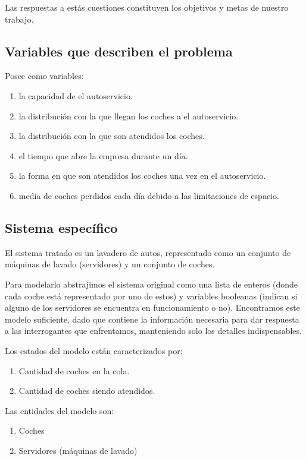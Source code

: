 \documentclass[14pt]{extarticle}
\begin{document}
Las respuestas a estás cuestiones constituyen los objetivos y metas de nuestro trabajo.


\subsection{Variables que describen el problema}
Posee como variables:

\begin{enumerate}
    \item la capacidad de el autoservicio.
    \item la distribución con la que llegan los coches a el autoservicio.
    \item la distribución con la que son atendidos los coches.
    \item el tiempo que abre la empresa durante un día.
    \item la forma en que son atendidos los coches una vez en el autoservicio.
    \item media de coches perdidos cada día debido a las limitaciones de espacio.
\end{enumerate}

\subsection{Sistema específico}

El sistema tratado es un lavadero de autos, representado como un conjunto de máquinas de lavado (servidores) y un conjunto de coches.

Para modelarlo abstrajimos el sistema original como una lista de enteros (donde cada coche está representado por uno de estos) y variables booleanas (indican si alguno de los servidores se encuentra en funcionamiento o no). Encontramos este modelo suficiente, dado que contiene la información necesaria para dar respuesta a las interrogantes que enfrentamos, manteniendo solo los detalles indispensables.

Los estados del modelo están caracterizados por:

\begin{enumerate}
    \item Cantidad de coches en la cola.
    \item Cantidad de coches siendo atendidos.
\end{enumerate}

Las entidades del modelo son:

\begin{enumerate}
    \item Coches
    \item Servidores (máquinas de lavado)
\end{enumerate}
\end{document}
